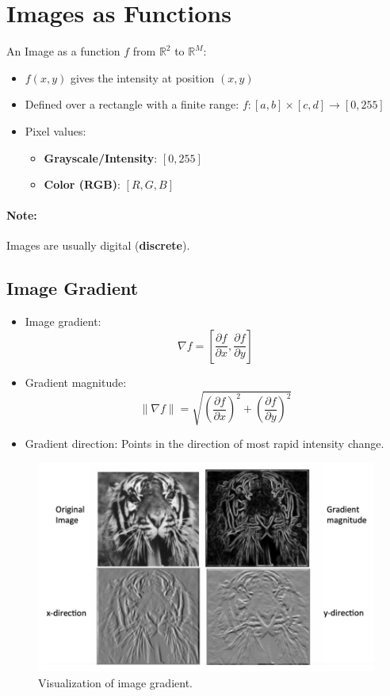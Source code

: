 \section{Images as Functions}

An Image as a function $ f $ from $ \mathbb{R}^2 $ to $ \mathbb{R}^M $:
\begin{itemize}
    \item $ f(x,y) $ gives the intensity at position $ (x,y) $
    \item Defined over a rectangle with a finite range:
    $ f: [a,b] \times [c,d] \rightarrow [0,255] $
    \item Pixel values:
    \begin{itemize}
        \item \textbf{Grayscale/Intensity}: $[0,255]$
        \item \textbf{Color (RGB)}: $[R, G, B]$
    \end{itemize}
\end{itemize}

\paragraph{Note:} Images are usually digital (\textbf{discrete}).

\subsection{Image Gradient}
\begin{itemize}
    \item Image gradient:
    $$
    \nabla f = \left[\frac{\partial f}{\partial x}, \frac{\partial f}{\partial y}\right]
    $$
    \item Gradient magnitude:
    $$
    \|\nabla f\| = \sqrt{\left(\frac{\partial f}{\partial x}\right)^2 + \left(\frac{\partial f}{\partial y}\right)^2}
    $$
    \item Gradient direction: Points in the direction of most rapid intensity change.
\end{itemize}

\begin{figure}[htbp]
    \centering
    \includegraphics[scale=0.3]{figures/VisualizingImageGradient.png}
    \caption{Visualization of image gradient.}
\end{figure}

